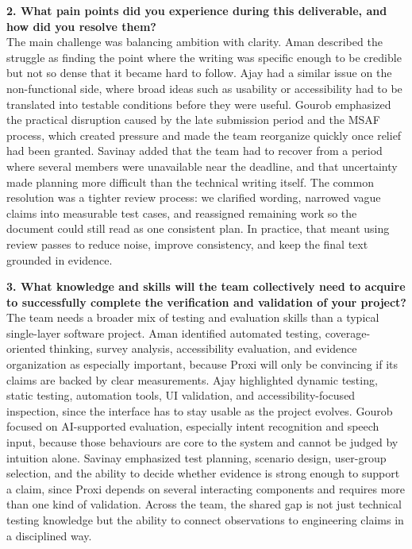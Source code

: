 \documentclass[12pt, titlepage]{article}
\begin{document}
\vspace{0.75em}

\noindent\textbf{2. What pain points did you experience during this
deliverable, and how did you resolve them?}\\
The main challenge was balancing ambition with clarity. Aman described the
struggle as finding the point where the writing was specific enough to be
credible but not so dense that it became hard to follow. Ajay had a similar
issue on the non-functional side, where broad ideas such as usability or
accessibility had to be translated into testable conditions before they were
useful. Gourob emphasized the practical disruption caused by the late
submission period and the MSAF process, which created pressure and made the
team reorganize quickly once relief had been granted. Savinay added that the
team had to recover from a period where several members were unavailable near
the deadline, and that uncertainty made planning more difficult than the
technical writing itself. The common resolution was a tighter review process:
we clarified wording, narrowed vague claims into measurable test cases, and
reassigned remaining work so the document could still read as one consistent
plan. In practice, that meant using review passes to reduce noise, improve
consistency, and keep the final text grounded in evidence.

\vspace{0.75em}

\noindent\textbf{3. What knowledge and skills will the team collectively
need to acquire to successfully complete the verification and validation of
your project?}\\
The team needs a broader mix of testing and evaluation skills than a typical
single-layer software project. Aman identified automated testing,
coverage-oriented thinking, survey analysis, accessibility evaluation, and
evidence organization as especially important, because Proxi will only be
convincing if its claims are backed by clear measurements. Ajay highlighted
dynamic testing, static testing, automation tools, UI validation, and
accessibility-focused inspection, since the interface has to stay usable as
the project evolves. Gourob focused on AI-supported evaluation, especially
intent recognition and speech input, because those behaviours are core to the
system and cannot be judged by intuition alone. Savinay emphasized test
planning, scenario design, user-group selection, and the ability to decide
whether evidence is strong enough to support a claim, since Proxi depends on
several interacting components and requires more than one kind of validation.
Across the team, the shared gap is not just technical testing knowledge but
the ability to connect observations to engineering claims in a disciplined
way.
\end{document}
